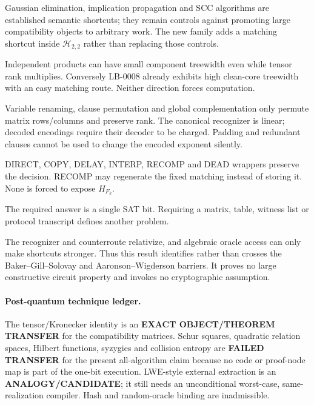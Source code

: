 \documentclass[11pt]{article}
\newcommand{\Htwo}{\mathcal H_{2,2}}
\begin{document}
\begin{description}[leftmargin=2.9cm,style=nextline]
\item[Affine/Horn/2SAT.] Gaussian elimination, implication propagation and
SCC algorithms are established semantic shortcuts; they remain controls
against promoting large compatibility objects to arbitrary work.  The new
family adds a matching shortcut inside $\Htwo$ rather than replacing those
controls.
\item[Bounded treewidth.] Independent products can have small component
treewidth even while tensor rank multiplies.  Conversely LB-0008 already
exhibits high clean-core treewidth with an easy matching route.  Neither
direction forces computation.
\item[Alternative encodings.] Variable renaming, clause permutation and
global complementation only permute matrix rows/columns and preserve rank.
The canonical recognizer is linear; decoded encodings require their decoder
to be charged.  Padding and redundant clauses cannot be used to change the
encoded exponent silently.
\item[Wrappers.] DIRECT, COPY, DELAY, INTERP, RECOMP and DEAD wrappers preserve
the decision.  RECOMP may regenerate the fixed matching instead of storing
it.  None is forced to expose $H_{F_k}$.
\item[One-bit output.] The required answer is a single SAT bit.  Requiring a
matrix, table, witness list or protocol transcript defines another problem.
\end{description}

The recognizer and counterroute relativize, and algebraic oracle access can
only make shortcuts stronger.  Thus this result identifies rather than
crosses the Baker--Gill--Solovay and Aaronson--Wigderson barriers.  It proves
no large constructive circuit property and invokes no cryptographic
assumption.

\paragraph{Post-quantum technique ledger.}
The tensor/Kronecker identity is an \textbf{EXACT OBJECT/THEOREM TRANSFER} for
the compatibility matrices.  Schur squares, quadratic relation spaces,
Hilbert functions, syzygies and collision entropy are \textbf{FAILED
TRANSFER} for the present all-algorithm claim because no code or proof-node
map is part of the one-bit execution.  LWE-style external extraction is an
\textbf{ANALOGY/CANDIDATE}; it still needs an unconditional worst-case,
same-realization compiler.  Hash and random-oracle binding are inadmissible.
\end{document}
